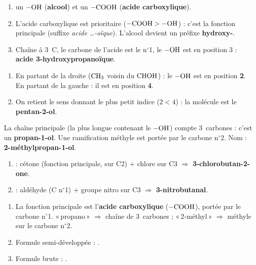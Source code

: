 \documentclass[11pt,a4paper]{article}
\begin{document}
\begin{corrige}
\begin{enumerate}[label=\alph*)]
  \item un $-\ce{OH}$ (\textbf{alcool}) et un $-\ce{COOH}$ (\textbf{acide carboxylique}).
  \item L'acide carboxylique est prioritaire ($-\ce{COOH} > -\ce{OH}$) : c'est la fonction principale (suffixe \textit{acide \dots-oïque}). L'alcool devient un préfixe \textbf{hydroxy-}.
  \item Chaîne à $3$~C, le carbone de l'acide est le n$^\circ$1, le $-\ce{OH}$ est en position 3 : \textbf{acide 3-hydroxypropanoïque}.
\end{enumerate}
\end{corrige}

\begin{corrige}
\begin{enumerate}[label=\alph*)]
  \item En partant de la droite ($\ce{CH3}$ voisin du $\ce{CHOH}$) : le $-\ce{OH}$ est en position \textbf{2}. En partant de la gauche : il est en position \textbf{4}.
  \item On retient le sens donnant le plus petit indice ($2 < 4$) : la molécule est le \textbf{pentan-2-ol}.
\end{enumerate}
\end{corrige}

\begin{corrige}
La chaîne principale (la plus longue contenant le $-\ce{OH}$) compte $3$~carbones : c'est un \textbf{propan-1-ol}. Une ramification méthyle est portée par le carbone n$^\circ$2. Nom : \textbf{2-méthylpropan-1-ol}.
\end{corrige}

\begin{corrige}
\begin{enumerate}[label=\alph*)]
  \item {} : cétone (fonction principale, sur C2) $+$ chlore sur C3 $\Rightarrow$ \textbf{3-chlorobutan-2-one}.
  \item {} : aldéhyde (C n$^\circ$1) $+$ groupe nitro sur C3 $\Rightarrow$ \textbf{3-nitrobutanal}.
\end{enumerate}
\end{corrige}

\begin{corrige}
\begin{enumerate}[label=\alph*)]
  \item La fonction principale est l'\textbf{acide carboxylique} ($-\ce{COOH}$), portée par le carbone n$^\circ$1. «\,propano\,» $\Rightarrow$ chaîne de $3$~carbones ; «\,2-méthyl\,» $\Rightarrow$ méthyle sur le carbone n$^\circ$2.
  \item Formule semi-développée : .
  \item Formule brute : .
\end{enumerate}
\end{corrige}
\end{document}

